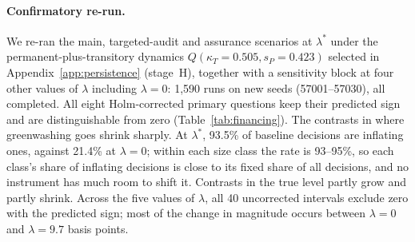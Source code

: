\documentclass[11pt]{article}
\begin{document}
\paragraph{Confirmatory re-run.} We re-ran the main, targeted-audit and assurance scenarios at $\lambda^*$ under the permanent-plus-transitory dynamics $Q(\kappa_T = 0.505, s_P = 0.423)$ selected in Appendix~\ref{app:persistence} (stage~H), together with a sensitivity block at four other values of $\lambda$ including $\lambda = 0$: 1,590 runs on new seeds (57001--57030), all completed. All eight Holm-corrected primary questions keep their predicted sign and are distinguishable from zero (Table~\ref{tab:financing}). The contrasts in where greenwashing goes shrink sharply. At $\lambda^*$, 93.5\% of baseline decisions are inflating ones, against 21.4\% at $\lambda = 0$; within each size class the rate is 93--95\%, so each class's share of inflating decisions is close to its fixed share of all decisions, and no instrument has much room to shift it. Contrasts in the true level partly grow and partly shrink. Across the five values of $\lambda$, all 40 uncorrected intervals exclude zero with the predicted sign; most of the change in magnitude occurs between $\lambda = 0$ and $\lambda = 9.7$ basis points.
\end{document}
